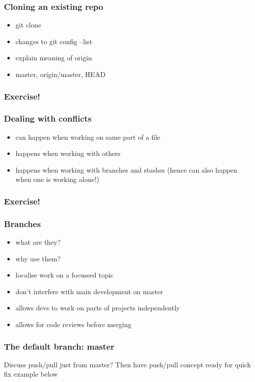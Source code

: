 \begin{frame}
\frametitle{Cloning an existing repo}
\begin{itemize}
    \item git clone
    \item changes to git config --list
    \item explain meaning of origin
    \item master, origin/master, HEAD
\end{itemize}
\end{frame}

\begin{frame}
\frametitle{Exercise!}
\end{frame}

\begin{frame}
\frametitle{Dealing with conflicts}
\begin{itemize}
    \item can happen when working on same part of a file
    \item happens when working with others
    \item happens when working with branches and stashes (hence can also
        happen when one is working alone!)
\end{itemize}
\end{frame}

\begin{frame}
\frametitle{Exercise!}
\end{frame}

\begin{frame}
\frametitle{Branches}
\begin{itemize}
    \item what are they?
    \item why use them?
    \item localise work on a focussed topic
    \item don't interfere with main development on master
    \item allows devs to work on parts of projects independently
    \item allows for code reviews before merging
\end{itemize}
\end{frame}

\begin{frame}
\frametitle{The default branch: master}

Discuss push/pull just from master?  Then have push/pull concept ready
for quick fix example below
\end{frame}


